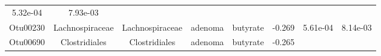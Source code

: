 \documentclass[11pt,]{article}
\begin{document}
\begin{longtable}[]{@{}cccccccc@{}}
\begin{minipage}[t]{0.08\columnwidth}
5.32e-04\strut
\end{minipage} & \begin{minipage}[t]{0.08\columnwidth}\centering\strut
7.93e-03\strut
\end{minipage}\tabularnewline
\begin{minipage}[t]{0.08\columnwidth}\centering\strut
Otu00230\strut
\end{minipage} & \begin{minipage}[t]{0.15\columnwidth}\centering\strut
Lachnospiraceae\strut
\end{minipage} & \begin{minipage}[t]{0.15\columnwidth}\centering\strut
Lachnospiraceae\strut
\end{minipage} & \begin{minipage}[t]{0.08\columnwidth}\centering\strut
adenoma\strut
\end{minipage} & \begin{minipage}[t]{0.09\columnwidth}\centering\strut
butyrate\strut
\end{minipage} & \begin{minipage}[t]{0.07\columnwidth}\centering\strut
-0.269\strut
\end{minipage} & \begin{minipage}[t]{0.08\columnwidth}\centering\strut
5.61e-04\strut
\end{minipage} & \begin{minipage}[t]{0.08\columnwidth}\centering\strut
8.14e-03\strut
\end{minipage}\tabularnewline
\begin{minipage}[t]{0.08\columnwidth}\centering\strut
Otu00690\strut
\end{minipage} & \begin{minipage}[t]{0.15\columnwidth}\centering\strut
Clostridiales\strut
\end{minipage} & \begin{minipage}[t]{0.15\columnwidth}\centering\strut
Clostridiales\strut
\end{minipage} & \begin{minipage}[t]{0.08\columnwidth}\centering\strut
adenoma\strut
\end{minipage} & \begin{minipage}[t]{0.09\columnwidth}\centering\strut
butyrate\strut
\end{minipage} & \begin{minipage}[t]{0.07\columnwidth}\centering\strut
-0.265\strut
\end{minipage} & \begin{minipage}[t]{0.08\columnwidth}\centering\strut

\end{minipage}
\end{longtable}
\end{document}
